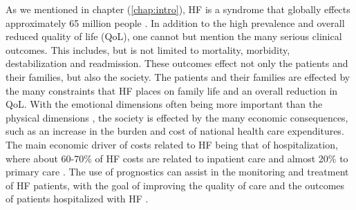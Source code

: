 \documentclass[../thesis.tex]{subfiles}
\begin{document}
\noindent As we mentioned in chapter (\ref{chap:intro}), HF is a syndrome that globally effects approximately 65 million people \citep{hay2017global}. In addition to the high prevalence and overall reduced quality of life (QoL), one cannot but mention the many serious clinical outcomes. This includes, but is not limited to mortality, morbidity, destabilization and readmission. These outcomes effect not only the patients and their families, but also the society. The patients and their families are effected by the many constraints that HF places on family life and an overall reduction in QoL. With the emotional dimensions often being more important than the physical dimensions \citep{dunderdale2005quality}, the society is effected by the many economic consequences, such as an increase in the burden and cost of national health care expenditures. The main economic driver of costs related to HF being that of hospitalization, where about 60-70\% of HF costs are related to inpatient care and almost 20\% to primary care \citep{braunwald2015war}. The use of prognostics can assist in the monitoring and treatment of HF patients, with the goal of improving the quality of care and the outcomes of patients hospitalized with HF 
\citep{tripoliti2017heart}.\\
\end{document}
